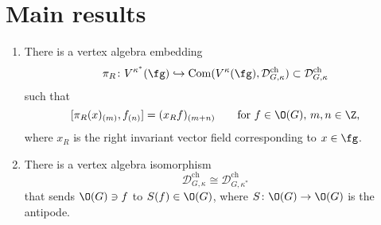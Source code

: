 \documentclass[a4paper, 10pt]{article}
\newcommand{\Dc}{ \mathcal{D}^{\mathrm{ch}}_{G, \kappa} }         %
\begin{document}
        \section{Main results}
            \begin{thm}
                \begin{enumerate}[label=(\roman*)]
                    \item There is a vertex algebra embedding \[\pi_R\colon V^{\kappa^*}(\fg) \hookrightarrow \mathrm{Com}(V^{\kappa}(\fg), \Dc) \subset \Dc \] such that \[[\pi_R(x)_{(m)}, f_{(n)}] = (x_Rf)_{(m+n)} \qquad \text{for $f \in \O(G)$, $m, n \in \Z$,} \] where $x_R$ is the right invariant vector field corresponding to $x \in \fg$.
                    \item There is a vertex algebra isomorphism \[\Dc \cong \mathcal{D}_{G, \kappa^*}^{\mathrm{ch}} \] that sends $\O(G) \ni f$ to $S(f) \in \O(G)$, where $S\colon \O(G) \to \O(G)$ is the antipode.
                \end{enumerate}
            \end{thm}
\end{document}
